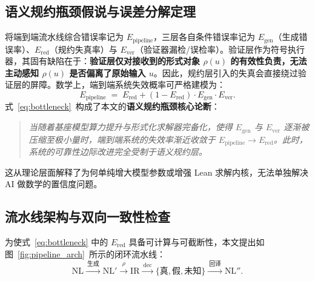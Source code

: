 ﻿\documentclass[UTF8,a4paper,11pt]{ctexart}
\theoremstyle{definition}
\begin{document}
\subsection{语义规约瓶颈假说与误差分解定理}
将端到端流水线综合错误率记为 $E_{\text{pipeline}}$，三层各自条件错误率记为 $E_{\text{gen}}$（生成错误率）、$E_{\text{red}}$（规约失真率）与 $E_{\text{ver}}$（验证器漏检/误检率）。验证层作为符号执行器，其固有缺陷在于：\textbf{验证层仅对接收到的形式对象 $\rho(u)$ 的有效性负责，无法主动感知 $\rho(u)$ 是否偏离了原始输入 $u$}。因此，规约层引入的失真会直接绕过验证层的屏障。数学上，端到端系统失效概率可严格建模为：
\begin{equation}
E_{\text{pipeline}} \;=\; E_{\text{red}} + (1 - E_{\text{red}}) \cdot E_{\text{gen}} \cdot E_{\text{ver}} .
\label{eq:bottleneck}
\end{equation}
式~\eqref{eq:bottleneck}~构成了本文的\textbf{语义规约瓶颈核心论断}：
\begin{quote}
\emph{当随着基座模型算力提升与形式化求解器完备化，使得 $E_{\text{gen}}$ 与 $E_{\text{ver}}$ 逐渐被压缩至极小量时，端到端系统的失效率渐近收敛于 $E_{\text{pipeline}} \to E_{\text{red}}$。此时，系统的可靠性边际改进完全受制于语义规约层。}
\end{quote}
这从理论层面解释了为何单纯增大模型参数或增强 Lean 求解内核，无法单独解决 AI 做数学的置信度问题\cite{wu2022auto,xin2024deepseekprover}。

\subsection{流水线架构与双向一致性检查}
为使式~\eqref{eq:bottleneck} 中的 $E_{\text{red}}$ 具备可计算与可截断性，本文提出如图~\ref{fig:pipeline_arch}~所示的闭环流水线：
\begin{equation}
\text{NL} \xrightarrow{\ \text{生成}\ } \text{NL}' \xrightarrow{\ \rho\ } \text{IR} \xrightarrow{\ \mathrm{dec}\ } \{\text{真},\text{假},\text{未知}\} \xrightarrow{\ \text{回译}\ } \text{NL}'' .
\end{equation}
\end{document}
